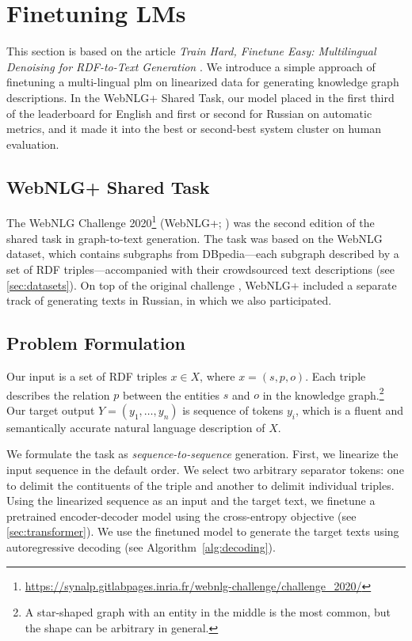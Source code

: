 \section{Finetuning LMs}
\label{sec:finetuning}
This section is based on the article \emph{Train Hard, Finetune Easy: Multilingual Denoising for RDF-to-Text Generation} \cite{kasnerTrainHardFinetune2020}. We introduce a simple approach of finetuning a multi-lingual \ac{plm} on linearized data for generating knowledge graph descriptions. In the WebNLG+ Shared Task, our model placed in the first third of the leaderboard for English and first or second for Russian on automatic metrics, and it made it into the best or second-best system cluster on human evaluation.

\subsection{WebNLG+ Shared Task}
\label{sec:webnlgp}
The WebNLG Challenge 2020\footnote{\url{https://synalp.gitlabpages.inria.fr/webnlg-challenge/challenge_2020/}} (WebNLG+; \citealp{ferreira20202020}) was the second edition of the shared task in graph-to-text generation. The task was based on the WebNLG dataset, which contains subgraphs from DBpedia---each subgraph described by a set of RDF triples---accompanied with their crowdsourced text descriptions (see \autoref{sec:datasets}). On top of the original challenge \cite{gardentWebNLGChallengeGenerating2017}, WebNLG+ included a separate track of generating texts in Russian, in which we also participated.


\subsection{Problem Formulation}
\label{sec:mbart}
Our input is a set of RDF triples $x \in X$, where $x = (s, p, o)$. Each triple describes the relation $p$ between the entities $s$ and $o$ in the knowledge graph.\footnote{A star-shaped graph with an entity in the middle is the most common, but the shape can be arbitrary in general.} Our target output $Y = (y_1, \ldots, y_n)$ is sequence of tokens $y_i$, which is a fluent and semantically accurate natural language description of $X$.


We formulate the task as \emph{sequence-to-sequence} generation. First, we linearize the input sequence in the default order. We select two arbitrary separator tokens: one to delimit the contituents of the triple and another to delimit individual triples. Using the linearized sequence as an input and the target text, we finetune a pretrained encoder-decoder model using the cross-entropy objective (see \autoref{sec:transformer}). We use the finetuned model to generate the target texts using autoregressive decoding (see Algorithm~\ref{alg:decoding}).

